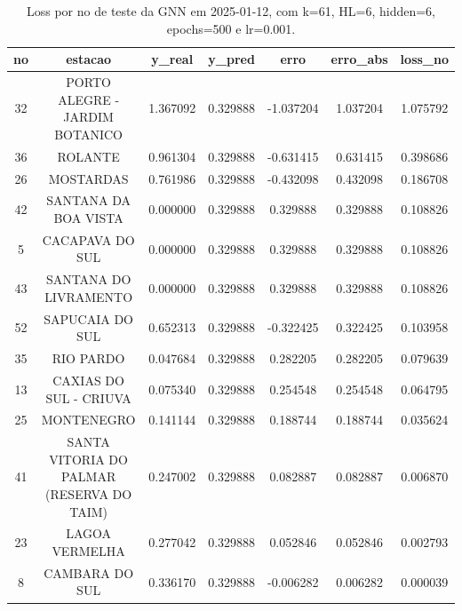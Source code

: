 \begin{table}[h]
\centering
\caption{Loss por no de teste da GNN em 2025-01-12, com k=61, HL=6, hidden=6, epochs=500 e lr=0.001.}
\label{tab:gnn_loss_k61_hl6_h6_e500_d20250112}
\begin{tabular}{ccccccc}
\toprule
no & estacao & y\_real & y\_pred & erro & erro\_abs & loss\_no \\
\midrule
32 & PORTO ALEGRE - JARDIM BOTANICO & 1.367092 & 0.329888 & -1.037204 & 1.037204 & 1.075792 \\
36 & ROLANTE & 0.961304 & 0.329888 & -0.631415 & 0.631415 & 0.398686 \\
26 & MOSTARDAS & 0.761986 & 0.329888 & -0.432098 & 0.432098 & 0.186708 \\
42 & SANTANA DA BOA VISTA & 0.000000 & 0.329888 & 0.329888 & 0.329888 & 0.108826 \\
5 & CACAPAVA DO SUL & 0.000000 & 0.329888 & 0.329888 & 0.329888 & 0.108826 \\
43 & SANTANA DO LIVRAMENTO & 0.000000 & 0.329888 & 0.329888 & 0.329888 & 0.108826 \\
52 & SAPUCAIA DO SUL & 0.652313 & 0.329888 & -0.322425 & 0.322425 & 0.103958 \\
35 & RIO PARDO & 0.047684 & 0.329888 & 0.282205 & 0.282205 & 0.079639 \\
13 & CAXIAS DO SUL - CRIUVA & 0.075340 & 0.329888 & 0.254548 & 0.254548 & 0.064795 \\
25 & MONTENEGRO & 0.141144 & 0.329888 & 0.188744 & 0.188744 & 0.035624 \\
41 & SANTA VITORIA DO PALMAR (RESERVA DO TAIM) & 0.247002 & 0.329888 & 0.082887 & 0.082887 & 0.006870 \\
23 & LAGOA VERMELHA & 0.277042 & 0.329888 & 0.052846 & 0.052846 & 0.002793 \\
8 & CAMBARA DO SUL & 0.336170 & 0.329888 & -0.006282 & 0.006282 & 0.000039 \\
\bottomrule
\end{tabular}
\end{table}
